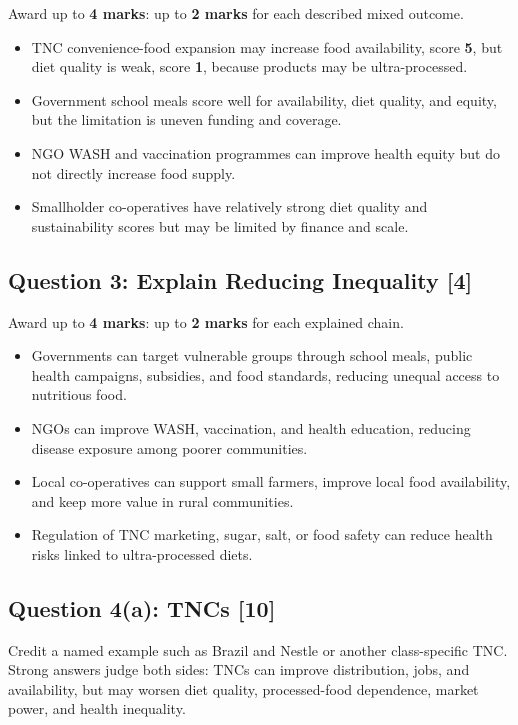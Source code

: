 \documentclass[11pt,a4paper]{article}
\newcommand{\term}[1]{\textcolor{HeadingBlue}{\textbf{#1}}}
\begin{document}
Award up to \term{4 marks}: up to \term{2 marks} for each described mixed
outcome.

\begin{itemize}
  \item TNC convenience-food expansion may increase food availability, score
  \term{5}, but diet quality is weak, score \term{1}, because products may be
  ultra-processed.
  \item Government school meals score well for availability, diet quality, and
  equity, but the limitation is uneven funding and coverage.
  \item NGO WASH and vaccination programmes can improve health equity but do
  not directly increase food supply.
  \item Smallholder co-operatives have relatively strong diet quality and
  sustainability scores but may be limited by finance and scale.
\end{itemize}

\subsection{Question 3: Explain Reducing Inequality [4]}

Award up to \term{4 marks}: up to \term{2 marks} for each explained chain.

\begin{itemize}
  \item Governments can target vulnerable groups through school meals, public
  health campaigns, subsidies, and food standards, reducing unequal access to
  nutritious food.
  \item NGOs can improve WASH, vaccination, and health education, reducing
  disease exposure among poorer communities.
  \item Local co-operatives can support small farmers, improve local food
  availability, and keep more value in rural communities.
  \item Regulation of TNC marketing, sugar, salt, or food safety can reduce
  health risks linked to ultra-processed diets.
\end{itemize}

\subsection{Question 4(a): TNCs [10]}

Credit a named example such as Brazil and Nestle or another class-specific
TNC. Strong answers judge both sides: TNCs can improve distribution, jobs, and
availability, but may worsen diet quality, processed-food dependence, market
power, and health inequality.
\end{document}

